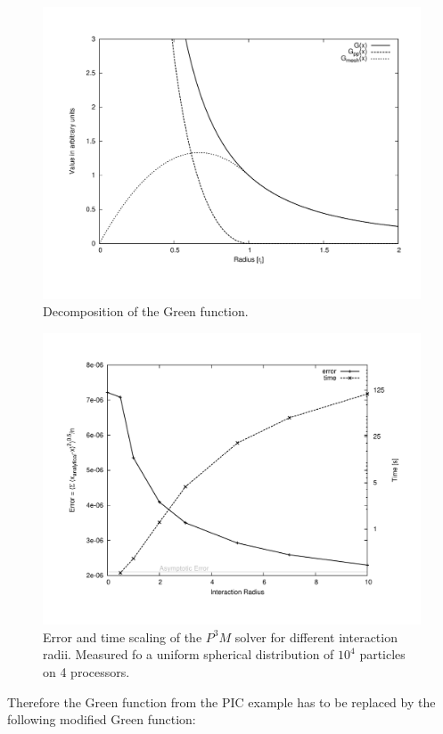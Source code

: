 \begin{figure}[h!]
\includegraphics[width=\textwidth]{greens}
\caption{Decomposition of the Green function.}
\label{greensfunction}
\end{figure}

\begin{figure}[h!]
\includegraphics[width=\textwidth]{error_time}
\caption{Error and time scaling of the $P^3M$ solver for different interaction radii. Measured fo a uniform spherical
distribution of $10^4$ particles on 4 processors.}
\label{errortime}
\end{figure}
\pagebreak
Therefore the Green function from the PIC example has to be replaced by the following modified Green function:


